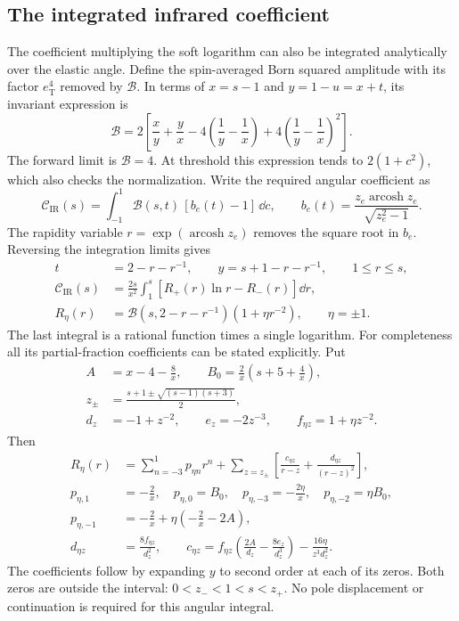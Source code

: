 \subsection{The integrated infrared coefficient}
The coefficient multiplying the soft logarithm can also be integrated
analytically over the elastic angle. Define the spin-averaged Born
squared amplitude with its factor $e_{\mathrm T}^4$ removed by $\mathcal B$.
In terms of $x=s-1$ and $y=1-u=x+t$, its invariant expression is
\begin{equation}
 \mathcal B=2\left[\frac xy+\frac yx
 -4\left(\frac1y-\frac1x\right)
 +4\left(\frac1y-\frac1x\right)^2\right].
\end{equation}
The forward limit is $\mathcal B=4$. At threshold this expression tends
to $2(1+c^2)$, which also checks the normalization. Write the required
angular coefficient as
\begin{equation}
 \mathcal C_{\mathrm{IR}}(s)=\int_{-1}^1
 \mathcal B(s,t)\,[b_e(t)-1]\,\dd c,
 \qquad b_e(t)=\frac{z_e\operatorname{arcosh}z_e}{\sqrt{z_e^2-1}}.
\end{equation}
The rapidity variable $r=\exp(\operatorname{arcosh}z_e)$ removes the
square root in $b_e$. Reversing the integration limits gives
\begin{align}
 t&=2-r-r^{-1},\qquad y=s+1-r-r^{-1},\qquad 1\leq r\leq s,\\
 \mathcal C_{\mathrm{IR}}(s)
 &=\frac{2s}{x^2}\int_1^s
 \left[R_+(r)\ln r-R_-(r)\right]\dd r,\\
 R_\eta(r)&=\mathcal B(s,2-r-r^{-1})(1+\eta r^{-2}),
 \qquad \eta=\pm1.
\end{align}
The last integral is a rational function times a single logarithm.
For completeness all its partial-fraction coefficients can be stated
explicitly. Put
\begin{align}
 A&=x-4-\frac8x,\qquad B_0=\frac2x\left(s+5+\frac4x\right),\\
 z_\pm&=\frac{s+1\pm\sqrt{(s-1)(s+3)}}2,\\
 d_z&=-1+z^{-2},\qquad e_z=-2z^{-3},
 \qquad f_{\eta z}=1+\eta z^{-2}.
\end{align}
Then
\begin{align}
 R_\eta(r)&=\sum_{n=-3}^{1}p_{\eta n}r^n
 +\sum_{z=z_\pm}\left[\frac{c_{\eta z}}{r-z}
 +\frac{d_{\eta z}}{(r-z)^2}\right],\\
 p_{\eta,1}&=-\frac2x,\quad p_{\eta,0}=B_0,
 \quad p_{\eta,-3}=-\frac{2\eta}x,\quad
 p_{\eta,-2}=\eta B_0,\\
 p_{\eta,-1}&=-\frac2x+\eta\left(-\frac2x-2A\right),\\
 d_{\eta z}&=\frac{8f_{\eta z}}{d_z^2},\qquad
 c_{\eta z}=f_{\eta z}\left(\frac{2A}{d_z}
 -\frac{8e_z}{d_z^3}\right)-\frac{16\eta}{z^3d_z^2}.
\end{align}
The coefficients follow by expanding $y$ to second order at each of its
zeros. Both zeros are outside the interval: $0<z_-<1<s<z_+$.
No pole displacement or continuation is required for this angular integral.


